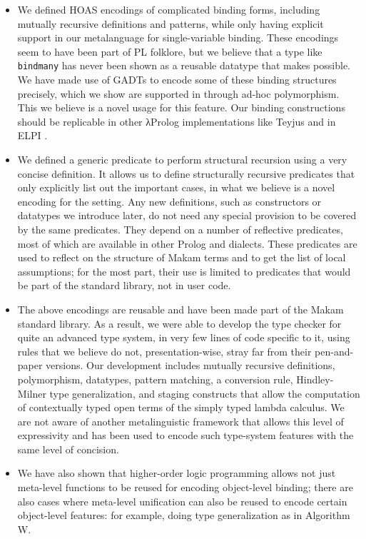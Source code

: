 \begin{itemize}
\item
  We defined HOAS encodings of complicated binding forms, including
  mutually recursive definitions and patterns, while only having
  explicit support in our metalanguage for single-variable binding.
  These encodings seem to have been part of PL folklore, but we believe
  that a type like \texttt{bindmany} has never been shown as a reusable
  datatype that \lamprolog makes possible. We have made use of GADTs to
  encode some of these binding structures precisely, which we show are
  supported in \lamprolog through ad-hoc polymorphism. This we believe
  is a novel usage for this \lamprolog feature. Our binding
  constructions should be replicable in other \foreignlanguage{greek}{λ}Prolog implementations
  like Teyjus \citep{teyjus-main-reference,teyjus-2-implementation} and
  in ELPI \citep{elpi-main-reference}.
\item
  We defined a generic predicate to perform structural recursion using a
  very concise definition. It allows us to define structurally recursive
  predicates that only explicitly list out the important cases, in what
  we believe is a novel encoding for the \lamprolog
   setting. Any new definitions, such as constructors or datatypes we
  introduce later, do not need any special provision to be covered by
  the same predicates. They depend on a number of reflective predicates,
  most of which are available in other Prolog and \lamprolog dialects.
  These predicates are used to reflect on the structure of Makam terms
  and to get the list of local assumptions; for the most part, their use
  is limited to predicates that would be part of the standard library,
  not in user code.
\item
  The above encodings are reusable and have been made part of the Makam
  standard library. As a result, we were able to develop the type
  checker for quite an advanced type system, in very few lines of code
  specific to it, using rules that we believe do not, presentation-wise,
  stray far from their pen-and-paper versions. Our development includes
  mutually recursive definitions, polymorphism, datatypes, pattern
  matching, a conversion rule, Hindley-Milner type generalization, and
  staging constructs that allow the computation of contextually typed
  open terms of the simply typed lambda calculus. We are not aware of
  another metalinguistic framework that allows this level of
  expressivity and has been used to encode such type-system features
  with the same level of concision.
\item
  We have also shown that higher-order logic programming allows not just
  meta-level functions to be reused for encoding object-level binding;
  there are also cases where meta-level unification can also be reused
  to encode certain object-level features: for example, doing type
  generalization as in Algorithm W.
\end{itemize}

